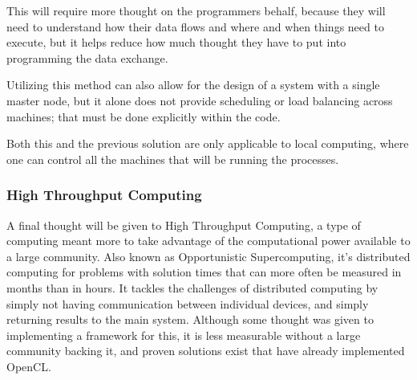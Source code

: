 \documentclass[../thesis.tex]{subfiles}
\begin{document}
            This will require more thought on the programmers behalf, because they will need to understand how their data flows and where and when things need to execute, but it helps reduce how much thought they have to put into programming the data exchange.

            Utilizing this method can also allow for the design of a system with a single master node, but it alone does not provide scheduling or load balancing across machines; that must be done explicitly within the code.

            Both this and the previous solution are only applicable to local computing, where one can control all the machines that will be running the processes.
        \subsubsection{High Throughput Computing} %
        \label{ssub:high_throughput_computing}
            A final thought will be given to High Throughput Computing, a type of computing meant more to take advantage of the computational power available to a large community. Also known as Opportunistic Supercomputing, it's distributed computing for problems with solution times that can more often be measured in months than in hours. It tackles the challenges of distributed computing by simply not having communication between individual devices, and simply returning results to the main system. Although some thought was given to implementing a framework for this, it is less measurable without a large community backing it, and proven solutions exist that have already implemented OpenCL\cite{boinc}. 
\end{document}
